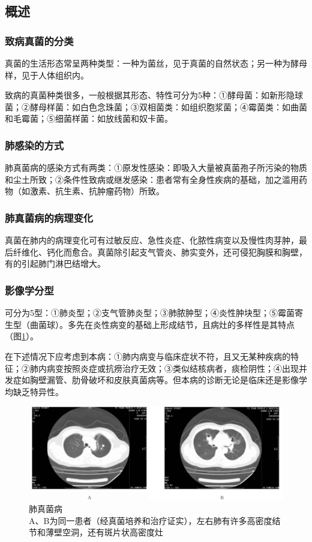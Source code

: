 \subsection{概述}

\subsubsection{致病真菌的分类}

真菌的生活形态常呈两种类型：一种为菌丝，见于真菌的自然状态；另一种为酵母样，见于人体组织内。

致病的真菌种类很多，一般根据其形态、特性可分为5种：①酵母菌：如新形隐球菌；②酵母样菌：如白色念珠菌；③双相菌类：如组织胞浆菌；④霉菌类：如曲菌和毛霉菌；⑤细菌样菌：如放线菌和奴卡菌。

\subsubsection{肺感染的方式}

肺真菌病的感染方式有两类：①原发性感染：即吸入大量被真菌孢子所污染的物质和尘土所致；②条件性致病或继发感染：患者常有全身性疾病的基础，加之滥用药物（如激素、抗生素、抗肿瘤药物）所致。

\subsubsection{肺真菌病的病理变化}

真菌在肺内的病理变化可有过敏反应、急性炎症、化脓性病变以及慢性肉芽肿，最后纤维化、钙化而愈合。真菌除引起支气管炎、肺实变外，还可侵犯胸膜和胸壁，有的引起肺门淋巴结增大。

\subsubsection{影像学分型}

可分为5型：①肺炎型；②支气管肺炎型；③肺脓肿型；④炎性肿块型；⑤霉菌寄生型（曲菌球）。多先在炎性病变的基础上形成结节，且病灶的多样性是其特点（图\ref{fig9-26}）。

在下述情况下应考虑到本病：①肺内病变与临床症状不符，且又无某种疾病的特征；②肺内病变按照炎症或抗痨治疗无效；③类似结核病者，痰检阴性；④出现并发症如胸壁漏管、肋骨破坏和皮肤真菌病等。但本病的诊断无论是临床还是影像学均缺乏特异性。

\begin{figure}[!htbp]
 \centering
 \includegraphics[width=.7\textwidth,height=\textheight,keepaspectratio]{./images/Image00214.jpg}
 \captionsetup{justification=centering}
 \caption{肺真菌病\\{\small A、B为同一患者（经真菌培养和治疗证实），左右肺有许多高密度结节和薄壁空洞，还有斑片状高密度灶}}
 \label{fig9-26}
  \end{figure} 

